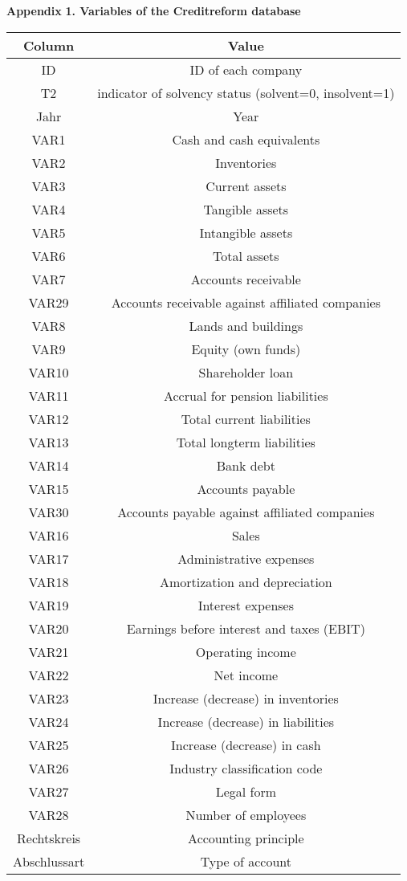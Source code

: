 \documentclass[11pt]{article}
\begin{document}
\newpage
\textbf{Appendix}
\vskip 0.2in
\textbf{1. Variables of the Creditreform database}
\vskip 0.1in
\begin{tabular}{cc} 
\hline\hline
Column & Value\\
\hline
ID & ID of each company\\
T2 & indicator of solvency status (solvent=0, insolvent=1)\\
Jahr & Year\\
VAR1 & Cash and cash equivalents\\
VAR2 & Inventories\\
VAR3 & Current assets\\
VAR4 & Tangible assets\\
VAR5 & Intangible assets\\
VAR6 & Total assets\\
VAR7 & Accounts receivable\\
VAR29 & Accounts receivable against affiliated companies\\
VAR8 & Lands and buildings\\
VAR9 & Equity (own funds)\\
VAR10 & Shareholder loan\\
VAR11 & Accrual for pension liabilities\\
VAR12 & Total current liabilities\\
VAR13 & Total longterm liabilities\\
VAR14 & Bank debt\\
VAR15 & Accounts payable\\
VAR30 & Accounts payable against affiliated companies\\
VAR16 & Sales\\
VAR17 & Administrative expenses\\
VAR18 & Amortization and depreciation\\
VAR19 & Interest expenses\\
VAR20 & Earnings before interest and taxes (EBIT)\\
VAR21 & Operating income\\
VAR22 & Net income\\
VAR23 & Increase (decrease) in inventories\\
VAR24 & Increase (decrease) in liabilities\\
VAR25 & Increase (decrease) in cash\\
VAR26 & Industry classification code\\
VAR27 & Legal form\\
VAR28 & Number of employees\\
Rechtskreis & Accounting principle\\
Abschlussart & Type of account\\
\hline\hline
\end{tabular}
\end{document}
